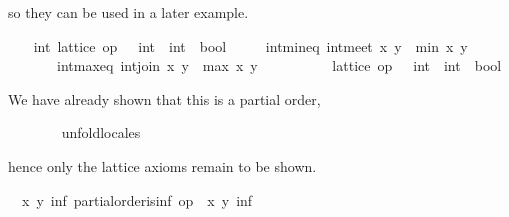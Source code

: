 \begin{isabellebody}
\begin{isamarkuptext}
  so they can be used in a later example.%
\end{isamarkuptext}%
\isamarkuptrue%
%
\isadelimvisible
\ \ %
\endisadelimvisible
%
\isatagvisible
{}\isamarkupfalse%
\ int{}\ lattice\ {}op\ {}\ {}{}\ int\ {}\ int\ {}\ bool{}\isanewline
\ \ \ \ \ int{}min{}eq{}\ {}int{}meet\ x\ y\ {}\ min\ x\ y{}\isanewline
\ \ \ \ \ \ \ int{}max{}eq{}\ {}int{}join\ x\ y\ {}\ max\ x\ y{}\isanewline
\ \ \isamarkupfalse%
\ {}\isanewline
\ \ \ \ \isamarkupfalse%
\ {}lattice\ {}op\ {}\ {}{}\ int\ {}\ int\ {}\ bool{}{}%
\begin{isamarkuptxt}%
\normalsize We have already shown that this is a partial
	order,%
\end{isamarkuptxt}%
\isamarkuptrue%
\ \ \ \ \ \ \isamarkupfalse%
\ unfold{}locales%
\begin{isamarkuptxt}%
\normalsize hence only the lattice axioms remain to be
	shown.
        \begin{isabelle}%
\ {}{}\ {}x\ y{}\ {}inf{}\ partial{}order{}is{}inf\ op\ {}\ x\ y\ inf\isanewline

\end{isabelle}
\end{isamarkuptxt}
\end{isabellebody}
